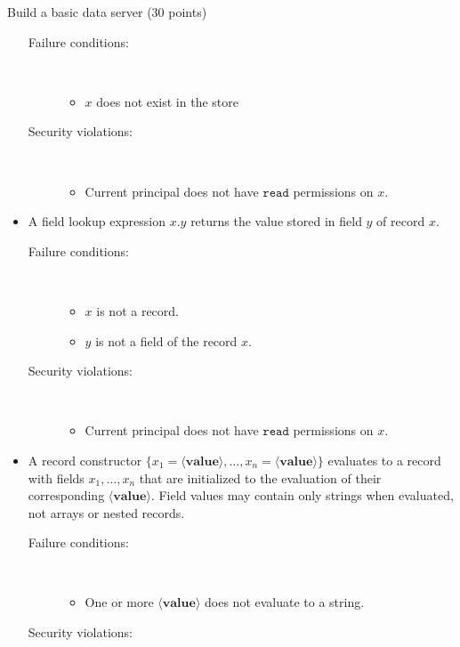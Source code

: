 \documentclass[11pt]{article}
\begin{document}
\begin{problem}{Build a basic data server (30 points)}
\begin{itemize}
\begin{description}
\item[Failure conditions:]\ \\[-1.5em]
\begin{itemize}
\item $x$ does not exist in the store
\end{itemize}
\item[Security violations:]\ \\[-1.5em]
\begin{itemize}
\item Current principal does not have $\mathtt{read}$ permissions on $x$.
\end{itemize}
\end{description}
\item A field lookup expression $x\mathtt{.}y$ returns the value stored in field $y$ of record $x$.
\begin{description}
\item[Failure conditions:]\ \\[-1.5em]
\begin{itemize}
\item $x$ is not a record.
\item $y$ is not a field of the record $x$.
\end{itemize}
\item[Security violations:]\ \\[-1.5em]
\begin{itemize}
\item Current principal does not have $\mathtt{read}$ permissions on $x$.
\end{itemize}
\end{description}
\item A record constructor $\{x_1 = \langle\mathbf{value}\rangle,\ldots,x_n = \langle\mathbf{value}\rangle\}$ evaluates to a record with fields $x_1, \ldots, x_n$ that are initialized to the evaluation of their corresponding $\langle\mathbf{value}\rangle$. Field values may contain only strings when evaluated, not arrays or nested records.
\begin{description}
\item[Failure conditions:]\ \\[-1.5em]
\begin{itemize}
\item One or more $\langle\mathbf{value}\rangle$ does not evaluate to a string.
\end{itemize}
\item[Security violations:]\ \\[-1.5em]

\end{description}
\end{itemize}
\end{problem}
\end{document}
